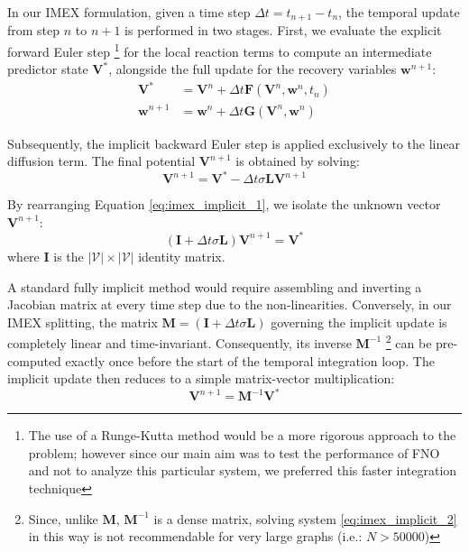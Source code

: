 In our IMEX formulation, given a time step $\Delta t = t_{n+1} - t_n$, the temporal update from step $n$ to $n+1$ is performed in two stages. First, we evaluate the explicit forward Euler step \footnote{The use of a Runge-Kutta method would be a more rigorous approach to the problem; however since our main aim was to test the performance of FNO and not to analyze this particular system, we preferred this faster integration technique} for the local reaction terms to compute an intermediate predictor state $\mathbf{V}^*$, alongside the full update for the recovery variables $\mathbf{w}^{n+1}$:
\begin{equation}
\label{eq:imex_explicit}
\begin{aligned}
\mathbf{V}^* &= \mathbf{V}^n + \Delta t \mathbf{F}(\mathbf{V}^n, \mathbf{w}^n, t_n) \\
\mathbf{w}^{n+1} &= \mathbf{w}^n + \Delta t \mathbf{G}(\mathbf{V}^n, \mathbf{w}^n)
\end{aligned}
\end{equation}

Subsequently, the implicit backward Euler step is applied exclusively to the linear diffusion term. The final potential $\mathbf{V}^{n+1}$ is obtained by solving:
\begin{equation}
\label{eq:imex_implicit_1}
\mathbf{V}^{n+1} = \mathbf{V}^* - \Delta t \sigma \mathbf{L} \mathbf{V}^{n+1}
\end{equation}

By rearranging Equation \eqref{eq:imex_implicit_1}, we isolate the unknown vector $\mathbf{V}^{n+1}$:
\begin{equation}
\label{eq:imex_implicit_2}
\left( \mathbf{I} + \Delta t \sigma \mathbf{L} \right) \mathbf{V}^{n+1} = \mathbf{V}^*
\end{equation}
where $\mathbf{I}$ is the $|\mathcal{V}| \times |\mathcal{V}|$ identity matrix. 

A standard fully implicit method would require assembling and inverting a Jacobian matrix at every time step due to the non-linearities. Conversely, in our IMEX splitting, the matrix $\mathbf{M} = \left( \mathbf{I} + \Delta t \sigma \mathbf{L} \right)$ governing the implicit update is completely linear and time-invariant. Consequently, its inverse $\mathbf{M}^{-1}$ \footnote{Since, unlike $\mathbf{M}$, $\mathbf{M}^{-1}$ is a dense matrix, solving system \eqref{eq:imex_implicit_2} in this way is not recommendable for very large graphs (i.e.: $N > 50000$)} can be pre-computed exactly once before the start of the temporal integration loop. The implicit update then reduces to a simple matrix-vector multiplication:
\begin{equation}
\label{eq:imex_final}
\mathbf{V}^{n+1} = \mathbf{M}^{-1} \mathbf{V}^*
\end{equation}


